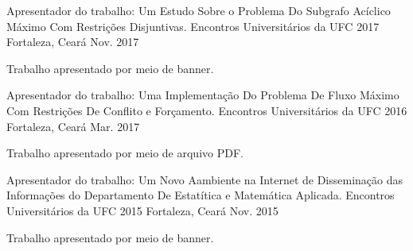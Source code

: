 

\begin{cventries}
  \cventry
    {Apresentador do trabalho: Um Estudo Sobre o Problema Do Subgrafo Acíclico Máximo Com Restrições Disjuntivas.} %
    {Encontros Universitários da UFC 2017} %
    {Fortaleza, Ceará} %
    {Nov. 2017} %
    {
      \begin{cvitems} %
        \item {Trabalho apresentado por meio de banner.}
      \end{cvitems}
    }
    
\vskip 0.2cm        
  \cventry
    {Apresentador do trabalho: Uma Implementação Do Problema De Fluxo Máximo Com Restrições De Conflito e Forçamento.} %
    {Encontros Universitários da UFC 2016} %
    {Fortaleza, Ceará} %
    {Mar. 2017} %
    {
      \begin{cvitems} %
        \item {Trabalho apresentado por meio de arquivo PDF.}
      \end{cvitems}
    }
\vskip 0.2cm
  \cventry
    {Apresentador do trabalho: Um Novo Aambiente na Internet de Disseminação
    das Informações do Departamento De Estatítica e Matemática Aplicada.} %
    {Encontros Universitários da UFC 2015} %
    {Fortaleza, Ceará} %
    {Nov. 2015} %
    {
      \begin{cvitems} %
        \item {Trabalho apresentado por meio de banner.}
      \end{cvitems}
    }




\end{cventries}

